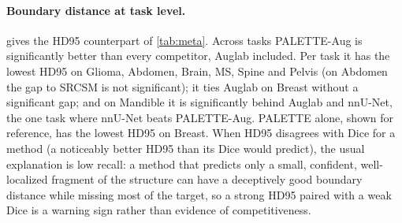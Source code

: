 \paragraph{Boundary distance at task level.}  gives the
HD95 counterpart of \cref{tab:meta}. Across tasks PALETTE-Aug is significantly
better than every competitor, Auglab included. Per task it has the lowest HD95
on Glioma, Abdomen, Brain, MS, Spine and Pelvis (on Abdomen the gap to
SRCSM is not significant); it ties Auglab on Breast without a significant gap; and on Mandible it
is significantly behind Auglab and nnU-Net, the
one task where nnU-Net beats PALETTE-Aug. PALETTE alone, shown for
reference, has the lowest HD95 on Breast. When HD95 disagrees with Dice for a
method (a noticeably better HD95 than its Dice would predict), the usual
explanation is low recall: a method that predicts only a small, confident,
well-localized fragment of the structure can have a deceptively good boundary
distance while missing most of the target, so a strong HD95 paired with a weak
Dice is a warning sign rather than evidence of competitiveness.

